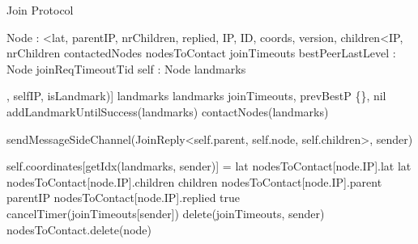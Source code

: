 
\begin{algorithm}{}
\caption{Join Protocol} \label{alg:memb:join}
\begin{algorithmic}[1]
    \asdtypes
        \State Node : <lat, parentIP, nrChildren, replied, IP, ID, coords, version, children<IP,  nrChildren\>\>
    \asdend
    \asdstate \label{alg:memb:join:state}
        \State contactedNodes 
        \State nodesToContact 
        \State joinTimeouts 
        \State bestPeerLastLevel : Node 
        \State joinReqTimeoutTid 
        \State self : Node 
        \State landmarks 
    \asdend

\asdupon[Init(landmarks : IP[], selfIP, isLandmark)] \label{alg:memb:join:init}
    \State landmarks \asdassign landmarks 
    \State joinTimeouts, prevBestP \asdassign \{\}, nil
    {addLandmarkUntilSuccess(landmarks) \label{alg:memb:join:add_land}} 
    {contactNodes(landmarks) \label{alg:memb:join:contact_landm}} 
\asdend


 \label{alg:memb:join:recv_join}
    \State sendMessageSideChannel(JoinReply<self.parent, self.node, self.children>, sender) 
\asdend
    
  \label{alg:memb:join:recv_join_reply}
                \State self.coordinates[getIdx(landmarks, sender)] = lat
            \EndIf
            \State nodesToContact[node.IP].lat \asdassign lat
            \State nodesToContact[node.IP].children \asdassign children
            \State nodesToContact[node.IP].parent \asdassign parentIP
            \State nodesToContact[node.IP].replied \asdassign true
            \State cancelTimer(joinTimeouts[sender])
            \State delete(joinTimeouts, sender)
        \Else
            \State nodesToContact.delete(node)
        \EndIf
\asdend


\end{algorithmic}
\end{algorithm}
